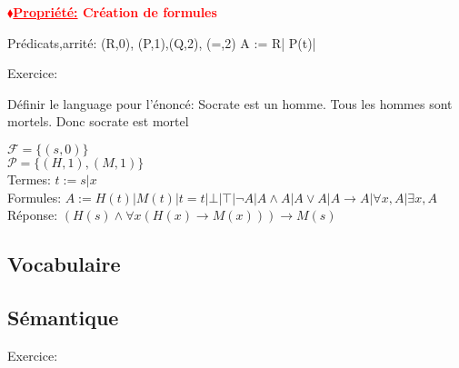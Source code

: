 \documentclass[12pt]{report}
\newcommand{\rd}[1]{\textcolor{red}{#1}}
\newcommand{\blz}{$\blacklozenge$}
\newcommand{\props}[1]
{
\begin{mybox}
\textbf{\rd{\underline{\blz Propriété:} #1}}
\vspace{0.5cm}
\newline
}
\newcommand{\prope}
{
\end{mybox}
}
\begin{document}
\props{Création de formules}
Prédicats,arrité: (R,0), (P,1),(Q,2), (=,2)
A := R| P(t)|
\prope

Exercice:

Définir le language pour l'énoncé: Socrate est un homme. Tous les hommes sont mortels. Donc socrate est mortel

$\mathcal{F} =  \lbrace (s,0)\rbrace$\\
$\mathcal{P} = \lbrace (H,1),(M,1)\rbrace$\\
Termes: $t := s | x$\\
Formules: $A := H(t) |M(t)| t=t| \bot | \top | \neg A| A \wedge A | A \vee A | A \to A| \forall x, A| \exists x, A$\\
Réponse: $(H(s) \wedge \forall x (H(x) \to M(x))) \to M(s)$  

\subsection{Vocabulaire}
\subsection{Sémantique}

Exercice:
\end{document}
